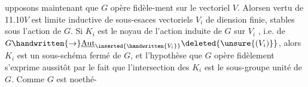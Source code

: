 upposons maintenant  que $G$ opère fidèle-\linebreak ment sur le vectoriel $V$. Alors\handwritten{,}en vertu de 11.10\handwritten{,}$V$ est limite inductive de sous-esaces vectoriels $V_i$ de diension finie, stables sous l'action de $G$. Si $K_i$ est le noyau de l'action induite de $G$ sur $V_i$ , i.e. de $G\handwritten{\to}\underline{\operatorname{Aut}}_{\inserted{\handwritten{V_i}}}\deleted{\unsure{(V_i)}}$, alors $K_i$ est un sous-schéma fermé de $G$, et l'hypothèse que $G$ opère fidèlement s'exprime aussitôt par le fait que  l'intersection des $K_i$ est le sous-groupe unité de $G$. Comme $G$ est noethé-%
